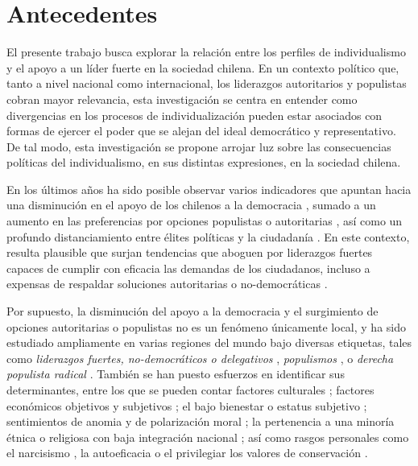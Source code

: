 \documentclass[12pt,twoside]{templates/facsothesis}
\begin{document}
\hypertarget{antecedentes}{%
\chapter{Antecedentes}\label{antecedentes}}

El presente trabajo busca explorar la relación entre los perfiles de individualismo y el apoyo a un líder fuerte en la sociedad chilena. En un contexto político que, tanto a nivel nacional como internacional, los liderazgos autoritarios y populistas cobran mayor relevancia, esta investigación se centra en entender como divergencias en los procesos de individualización pueden estar asociados con formas de ejercer el poder que se alejan del ideal democrático y representativo. De tal modo, esta investigación se propone arrojar luz sobre las consecuencias políticas del individualismo, en sus distintas expresiones, en la sociedad chilena.

En los últimos años ha sido posible observar varios indicadores que apuntan hacia una disminución en el apoyo de los chilenos a la democracia \citep{cep}, sumado a un aumento en las preferencias por opciones populistas o autoritarias \citep{cadem2023, cerc-mori, diaz2023}, así como un profundo distanciamiento entre élites políticas y la ciudadanía \citep{luna2016}. En este contexto, resulta plausible que surjan tendencias que aboguen por liderazgos fuertes capaces de cumplir con eficacia las demandas de los ciudadanos, incluso a expensas de respaldar soluciones autoritarias o no-democráticas \citep{carlin2018}.

Por supuesto, la disminución del apoyo a la democracia y el surgimiento de opciones autoritarias o populistas no es un fenómeno únicamente local, y ha sido estudiado ampliamente en varias regiones del mundo bajo diversas etiquetas, tales como \emph{liderazgos fuertes, no-democráticos o delegativos} \citep{carlin2011, carlin2018, crimston2022, kang2018, lima2021, selvanathan2022, xuereb2021}, \emph{populismos} \citep{baro2022, gidron2020, nowakowski2021}, o \emph{derecha populista radical} \citep{diaz2023, donovan2019, donovan2021}. También se han puesto esfuerzos en identificar sus determinantes, entre los que se pueden contar factores culturales \citep{lima2021, marchlewska2022, selvanathan2022}; factores económicos objetivos y subjetivos \citep{arikan2019, rico2020, wu2019, xuereb2021}; el bajo bienestar o estatus subjetivo \citep{gidron2020, nowakowski2021}; sentimientos de anomia y de polarización moral \citep{crimston2022}; la pertenencia a una minoría étnica o religiosa con baja integración nacional \citep{eskelinen2020}; así como rasgos personales como el narcisismo \citep{marchlewska2019}, la autoeficacia \citep{rico2020} o el privilegiar los valores de conservación \citep{baro2022}.
\end{document}
